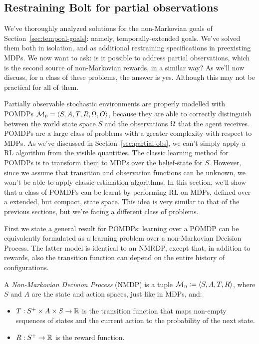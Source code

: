 \subsection{Restraining Bolt for partial observations}

\label{sec:rb-for-partial-obs}

We've thoroughly analyzed solutions for the non-Markovian goals of
Section~\ref{sec:tempoal-goals}: namely, temporally-extended goals. We've
solved them both in isolation, and as additional restraining specifications in
preexisting MDPs. We now want to ask: is it possible to address partial
observations, which is the second source of non-Markovian rewards, in a
similar way? As we'll now discuss, for a class of these problems, the answer
is yes. Although this may not be practical for all of them.

Partially observable stochastic environments are properly modelled with POMDPs
$\mathcal{M}_p = \langle S, A, T, R, \Omega, O\rangle$, because they are able to
correctly distinguish between the world state space $S$ and the observations
$\Omega$ that the agent receives. POMDPs are a large class of problems with a
greater complexity with respect to MDPs. As we've discussed in
Section~\ref{sec:partial-obs}, we can't simply apply a RL algorithm from the
visible quantities. The classic learning method for POMDPs is to transform
them to MDPs over the belief-state for $S$. However, since we assume that
transition and observation functions can be unknown, we won't be able to apply
classic estimation algorithms. In this section, we'll show that a class of
POMDPs can be learnt by performing RL on MDPs, defined over a extended, but
compact, state space. This idea is very similar to that of the previous
sections, but we're facing a different class of problems.

First we state a general result for POMDPs: learning over a POMDP can be
equivalently formulated as a learning problem over a non-Markovian Decision
Process. The latter model is identical to an NMRDP, except that, in addition
to rewards, also the transition function can depend on the entire history of
configurations.
\begin{definition}
	A \emph{Non-Markovian Decision Process}
	(NMDP) is a tuple
	$\mathcal{M}_n \coloneqq \langle S, A, T, R \rangle$, where $S$ and $A$ are
	the state and action spaces, just like in MDPs, and:
	\begin{itemize}
		\item $T: S^+ \times A \times S \to \mathbb{R}$ is the transition function that
			maps non-empty sequences of states and the current action to the
			probability of the next state.
		\item $R: S^+ \to \mathbb{R}$ is the reward function.
	\end{itemize}
	\label{def:nmdp-general}
\end{definition}

